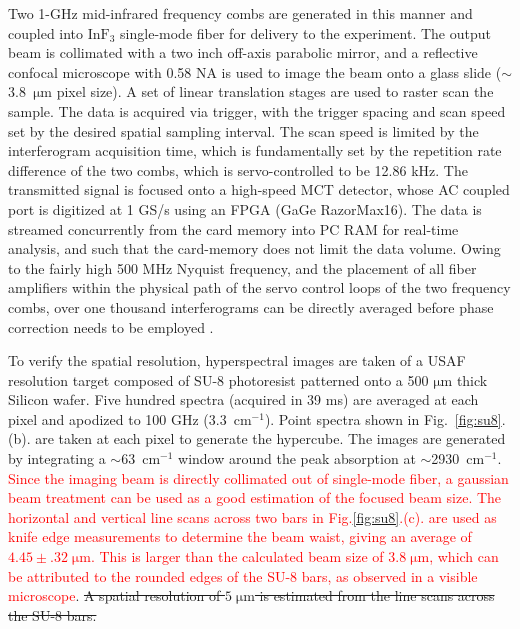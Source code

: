 \documentclass[aip,preprint]{revtex4-1}
\begin{document}
Two 1-GHz mid-infrared frequency combs are generated in this manner and coupled into $\mathrm{InF_3}$ single-mode fiber for delivery to the experiment. The output beam is collimated with a two inch off-axis parabolic mirror, and a reflective confocal microscope with 0.58 NA is used to image the beam onto a glass slide (\mbox{$\sim$3.8 $\mathrm{\mu m}$} pixel size). A set of linear translation stages are used to raster scan the sample. The data is acquired via trigger, with the trigger spacing and scan speed set by the desired spatial sampling interval. The scan speed is limited by the interferogram acquisition time, which is fundamentally set by the repetition rate difference of the two combs, which is servo-controlled to be 12.86 kHz. The transmitted signal is focused onto a high-speed MCT detector, whose AC coupled port is digitized at 1 GS/s using an FPGA (GaGe RazorMax16). The data is streamed concurrently from the card memory into PC RAM for real-time analysis, and such that the card-memory does not limit the data volume. Owing to the fairly high 500 MHz Nyquist frequency, and the placement of all fiber amplifiers within the physical path of the servo control loops of the two frequency combs, over one thousand interferograms can be directly averaged before phase correction needs to be employed \cite{hebertSelfcorrectedChipbasedDualcomb2017,hebertSelfCorrectionLimitsDualComb2019}.

To verify the spatial resolution, hyperspectral images are taken of a USAF resolution target composed of SU-8 photoresist patterned onto a 500 $\mathrm{\mu m}$ thick Silicon wafer. Five hundred spectra (acquired in 39 ms) are averaged at each pixel and apodized to 100 GHz (\mbox{3.3 $\mathrm{cm^{-1}}$}). Point spectra shown in \mbox{Fig. \ref{fig:su8}.(b).} are taken at each pixel to generate the hypercube. The images are generated by integrating a \mbox{$\sim$63 $\mathrm{cm^{-1}}$} window around the peak absorption at \mbox{$\sim$2930 $\mathrm{cm^{-1}}$}. \textcolor{red}{Since the imaging beam is directly collimated out of single-mode fiber, a gaussian beam treatment can be used as a good estimation of the focused beam size. The horizontal and vertical line scans across two bars in Fig.\ref{fig:su8}.(c). are used as knife edge measurements \cite{dearaujoMeasurementGaussianLaser2009} to determine the beam waist, giving an average of \mbox{$\mathrm{4.45 \pm .32 \; \mu m}$}. This is larger than the calculated beam size of \mbox{$\mathrm{3.8 \; \mu m}$}, which can be attributed to the rounded edges of the SU-8 bars, as observed in a visible microscope}. \sout{A spatial resolution of \mbox{$5 \; \mathrm{\mu m}$} is estimated from the line scans across the SU-8 bars.}
\end{document}
